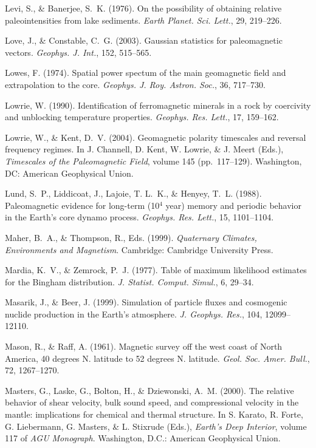 \documentclass[,plain]{tauxe}
\begin{document}
\begin{thebibliography}{}
\bibitem{}%
Levi, S., \& Banerjee, S.~K. (1976).
On the possibility of obtaining relative paleointensities from lake sediments.
{\it Earth Planet. Sci. Lett.}, 29, 219--226.

\bibitem{}%
Love, J., \& Constable, C.~G. (2003).
Gaussian statistics for paleomagnetic vectors.
{\it Geophys. J. Int.}, 152, 515--565.

\bibitem{}%
Lowes, F. (1974).
Spatial power spectum of the main geomagnetic field and extrapolation to the core.
{\it Geophys. J. Roy. Astron. Soc.}, 36, 717--730.

\bibitem{}%
Lowrie, W. (1990).
Identification of ferromagnetic minerals in a rock by coercivity and unblocking temperature properties.
{\it Geophys. Res. Lett.}, 17, 159--162.

\bibitem{}%
Lowrie, W., \& Kent, D.~V. (2004).
Geomagnetic polarity timescales and reversal frequency regimes.
In J. Channell, D. Kent, W. Lowrie, \& J. Meert (Eds.), {\it Timescales of the Paleomagnetic Field}, volume 145 (pp.\ 117--129). Washington, DC: American Geophysical Union.

\bibitem{}%
Lund, S.~P., Liddicoat, J., Lajoie, T. L.~K., \& Henyey, T.~L. (1988).
Paleomagnetic evidence for long-term (10$^4$ year) memory and periodic behavior in the Earth's core dynamo process.
{\it Geophys. Res. Lett.}, 15, 1101--1104.

\bibitem{}%
Maher, B.~A., \& Thompson, R., Eds. (1999).
{\it Quaternary Climates, Environments and Magnetism}.
Cambridge: Cambridge University Press.

\bibitem{}%
Mardia, K.~V., \& Zemrock, P.~J. (1977).
Table of maximum likelihood estimates for the Bingham distribution.
{\it J. Statist. Comput. Simul.}, 6, 29--34.

\bibitem{}%
Masarik, J., \& Beer, J. (1999).
Simulation of particle fluxes and cosmogenic nuclide production in the Earth's atmosphere.
{\it J. Geophys. Res.}, 104, 12099--12110.

\bibitem{}%
Mason, R., \& Raff, A. (1961).
Magnetic survey off the west coast of North America, 40 degrees N. latitude to 52 degrees N. latitude.
{\it Geol. Soc. Amer. Bull.}, 72, 1267--1270.

\bibitem{}%
Masters, G., Laske, G., Bolton, H., \& Dziewonski, A.~M. (2000).
The relative behavior of shear velocity, bulk sound speed, and compressional velocity in the mantle: implications for chemical and thermal structure.
In S. Karato, R. Forte, G. Liebermann, G. Masters, \& L. Stixrude (Eds.), {\it Earth's Deep Interior}, volume 117 of {\it AGU Monograph}. Washington, D.C.: American Geophysical Union.


\end{thebibliography}
\end{document}
